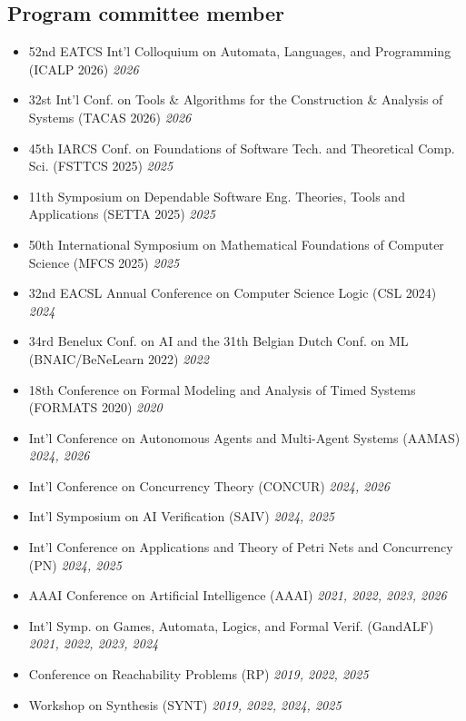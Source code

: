 \documentclass[10pt,a4paper]{moderncv}
\begin{document}
\subsection{Program committee member}
\begin{itemize}
  \item 52nd EATCS Int'l Colloquium on Automata, Languages, and
    Programming (ICALP 2026) \hfill \textit{2026}
  \item 32st Int'l Conf. on Tools \& Algorithms for the
    Construction \& Analysis of Systems (TACAS 2026) \hfill \textit{2026}
  \item 45th IARCS Conf. on Foundations of Software Tech. and
    Theoretical Comp. Sci. (FSTTCS 2025) \hfill \textit{2025}
  \item 11th Symposium on Dependable Software Eng. Theories, Tools and
    Applications (SETTA 2025) \hfill \textit{2025}
  \item 50th International Symposium on Mathematical Foundations of Computer
    Science (MFCS 2025) \hfill \textit{2025}
  \item 32nd EACSL Annual Conference on Computer Science Logic (CSL 2024)
    \hfill \textit{2024}
  \item 34rd Benelux Conf. on AI and the 31th
    Belgian Dutch Conf. on ML (BNAIC/BeNeLearn 2022) \hfill \textit{2022}
  \item 18th Conference on Formal Modeling and Analysis of Timed
    Systems (FORMATS 2020) \hfill \textit{2020}
  \item Int'l Conference on Autonomous Agents and Multi-Agent
    Systems (AAMAS) \hfill \textit{2024, 2026}
  \item Int'l Conference on Concurrency Theory (CONCUR) \hfill
    \textit{2024, 2026}
  \item Int'l Symposium on AI Verification (SAIV) \hfill
    \textit{2024, 2025}
  \item Int'l Conference on Applications and Theory of Petri Nets
    and Concurrency (PN) \hfill \textit{2024, 2025}
  \item AAAI Conference on Artificial Intelligence (AAAI) \hfill
    \textit{2021, 2022, 2023, 2026}
  \item Int'l Symp. on Games, Automata, Logics, and Formal
    Verif. (GandALF) \hfill \textit{2021, 2022, 2023, 2024}
  \item Conference on Reachability Problems (RP) \hfill \textit{2019, 2022,
    2025}
  \item Workshop on Synthesis (SYNT) \hfill \textit{2019, 2022, 2024, 2025}
\end{itemize}
\end{document}
